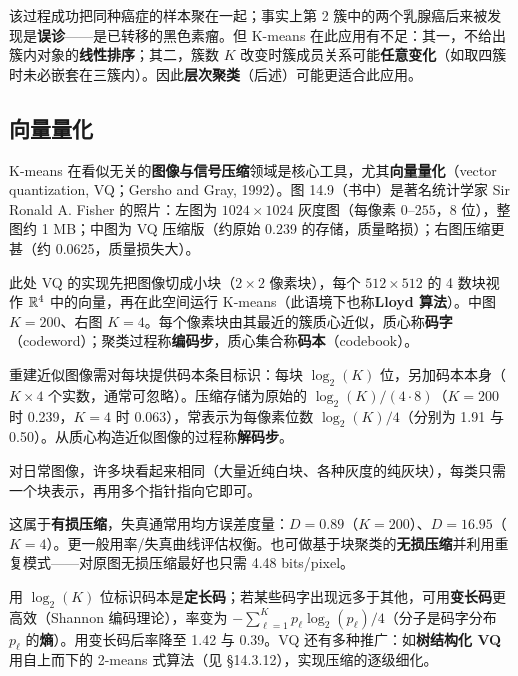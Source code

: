 该过程成功把同种癌症的样本聚在一起；事实上第 2 簇中的两个乳腺癌后来被发现是\textbf{误诊}——是已转移的黑色素瘤。但 K-means 在此应用有不足：其一，不给出簇内对象的\textbf{线性排序}；其二，簇数 $K$ 改变时簇成员关系可能\textbf{任意变化}（如取四簇时未必嵌套在三簇内）。因此\textbf{层次聚类}（后述）可能更适合此应用。

\subsection{向量量化}

K-means 在看似无关的\textbf{图像与信号压缩}领域是核心工具，尤其\textbf{向量量化}（vector quantization, VQ；Gersho and Gray, 1992）。图 14.9（书中）是著名统计学家 Sir Ronald A. Fisher 的照片：左图为 $1024\times 1024$ 灰度图（每像素 $0$--$255$，8 位），整图约 1 MB；中图为 VQ 压缩版（约原始 0.239 的存储，质量略损）；右图压缩更甚（约 0.0625，质量损失大）。

此处 VQ 的实现先把图像切成小块（$2\times 2$ 像素块），每个 $512\times 512$ 的 4 数块视作 $\mathbb{R}^4$ 中的向量，再在此空间运行 K-means（此语境下也称\textbf{Lloyd 算法}）。中图 $K=200$、右图 $K=4$。每个像素块由其最近的簇质心近似，质心称\textbf{码字}（codeword）；聚类过程称\textbf{编码步}，质心集合称\textbf{码本}（codebook）。

重建近似图像需对每块提供码本条目标识：每块 $\log_2(K)$ 位，另加码本本身（$K\times 4$ 个实数，通常可忽略）。压缩存储为原始的 $\log_2(K)/(4\cdot 8)$（$K=200$ 时 0.239，$K=4$ 时 0.063），常表示为每像素位数 $\log_2(K)/4$（分别为 1.91 与 0.50）。从质心构造近似图像的过程称\textbf{解码步}。

\begin{remark}[VQ 为什么有效]
对日常图像，许多块看起来相同（大量近纯白块、各种灰度的纯灰块），每类只需一个块表示，再用多个指针指向它即可。
\end{remark}

这属于\textbf{有损压缩}，失真通常用均方误差度量：$D=0.89$（$K=200$）、$D=16.95$（$K=4$）。更一般用率/失真曲线评估权衡。也可做基于块聚类的\textbf{无损压缩}并利用重复模式——对原图无损压缩最好也只需 4.48 bits/pixel。

用 $\log_2(K)$ 位标识码本是\textbf{定长码}；若某些码字出现远多于其他，可用\textbf{变长码}更高效（Shannon 编码理论），率变为 $-\sum_{\ell=1}^{K}p_\ell\log_2(p_\ell)/4$（分子是码字分布 $p_\ell$ 的\textbf{熵}）。用变长码后率降至 1.42 与 0.39。VQ 还有多种推广：如\textbf{树结构化 VQ} 用自上而下的 2-means 式算法（见 §14.3.12），实现压缩的逐级细化。

